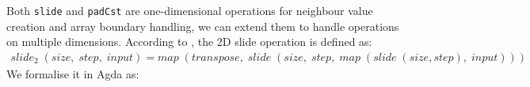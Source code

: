 \documentclass{l4proj}
\begin{document}
Both \texttt{slide} and \texttt{padCst} are one-dimensional operations for neighbour value creation and array boundary handling, we can extend them to handle operations on multiple dimensions. According to \cite{hagedorn2018high}, the 2D slide operation is defined as:
\begin{align}
\label{lift:slide2d}
    slide_2\; (size,\; step,\; input) = map\;(transpose,\; slide\;(size,\; step,\; map\;(slide\;(size, step),\; input)))
\end{align}
We formalise it in Agda as:
\begin{code}%
\>[0]\<%
\\
\>[0]\AgdaSpace{}%
\AgdaSymbol{:}%
\>[1071I]\AgdaSymbol{\{}\AgdaSpace{}%
\AgdaSpace{}%
\AgdaSymbol{:}\AgdaSpace{}%
\AgdaSymbol{\}}\AgdaSpace{}%
\AgdaSpace{}%
\AgdaSymbol{(}\AgdaSpace{}%
\AgdaSymbol{:}\AgdaSpace{}%
\AgdaSymbol{)}\AgdaSpace{}%
\AgdaSpace{}%
\AgdaSymbol{(}\AgdaSpace{}%
\AgdaSymbol{:}\AgdaSpace{}%
\AgdaSpace{}%
\AgdaSymbol{\{}\AgdaSpace{}%
\AgdaSymbol{:}\AgdaSpace{}%
\AgdaSymbol{\}}\AgdaSpace{}%
\<%
\\
\>[.][@{}l@{}]\<[1071I]%
\>[9]\AgdaSpace{}%
\AgdaSymbol{(}\AgdaSpace{}%
\AgdaSpace{}%
\AgdaSymbol{(}\AgdaSpace{}%
\AgdaOperator{\AgdaPrimitive{+}}\AgdaSpace{}%
\AgdaSpace{}%
\AgdaOperator{\AgdaPrimitive{*}}\AgdaSpace{}%
\AgdaSymbol{(}\AgdaSpace{}%
\AgdaSymbol{)))}\AgdaSpace{}%
\AgdaSymbol{(}\AgdaSpace{}%
\AgdaOperator{\AgdaPrimitive{+}}\AgdaSpace{}%
\AgdaSpace{}%
\AgdaOperator{\AgdaPrimitive{*}}\AgdaSpace{}%
\AgdaSymbol{(}\AgdaSpace{}%
\AgdaSymbol{))}\AgdaSpace{}%
\<%
\\
%
\>[9]\AgdaSpace{}%
\AgdaSymbol{(}\AgdaSpace{}%
\AgdaSymbol{(}\AgdaSpace{}%
\AgdaSymbol{(}\AgdaSpace{}%
\AgdaSpace{}%
\AgdaSymbol{)}\AgdaSpace{}%
\AgdaSymbol{)}\AgdaSpace{}%
\AgdaSymbol{(}\AgdaSpace{}%
\AgdaSymbol{))}\AgdaSpace{}%
\AgdaSymbol{(}\AgdaSpace{}%
\AgdaSymbol{)}\<%
\\

\end{code}
\end{document}
